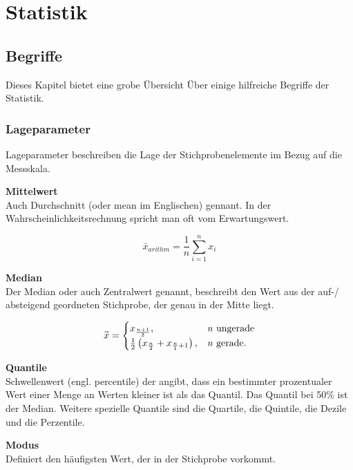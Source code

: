 \newpage
\section{Statistik}
\label{sec:stat}

\subsection{Begriffe}
\begin{flushleft}
Dieses Kapitel bietet eine grobe Übersicht Über einige hilfreiche Begriffe der Statistik.

\subsubsection{Lageparameter}
Lageparameter beschreiben die Lage der Stichprobenelemente im Bezug auf die Messskala.
\linebreak

\textbf{Mittelwert} \\
Auch Durchschnitt (oder mean im Englischen) gennant. In der Wahrscheinlichkeitsrechnung spricht man oft vom Erwartungswert.

$$\bar{x}_{arithm} = \frac{1}{n} \sum_{i=1}^{n} x_i$$

\textbf{Median} \\ 
Der Median oder auch Zentralwert genannt, beschreibt den Wert aus der auf-/ absteigend geordneten Stichprobe, der genau in der Mitte liegt.

\begin{equation*}
  \widetilde{x} = \begin{cases}
    x_{\frac{n+1}{2}}, & \text{\textit{n} ungerade}\\
    \frac{1}{2} \left( x_{\frac{n}{2}} + x_{\frac{n}{1}+1} \right), & \text{\textit{n} gerade}.
  \end{cases}
\end{equation*}


\textbf{Quantile} \\
Schwellenwert (engl. percentile) der angibt, dass ein bestimmter prozentualer Wert einer Menge an Werten kleiner ist als das Quantil. 
Das Quantil bei 50\% ist der Median. Weitere spezielle Quantile sind die Quartile, die Quintile, die Dezile und die Perzentile.
\linebreak

\textbf{Modus} \\
Definiert den häufigsten Wert, der in der Stichprobe vorkommt.
\linebreak


\end{flushleft}
